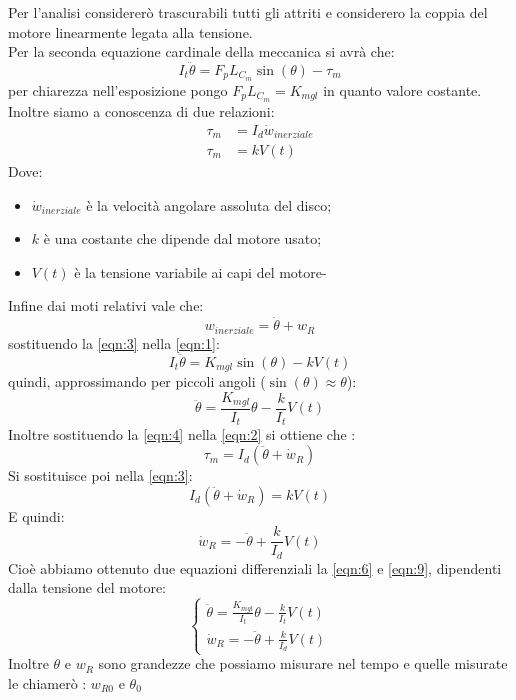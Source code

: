 \documentclass[12pt,a4paper,twoside, openright]{scrartcl}
\newcommand{\thetap}{\dot{\theta}}
\newcommand{\thetapp}{\ddot{\theta}}
\begin{document}
	Per l'analisi considererò trascurabili tutti gli attriti e considerero la coppia del motore linearmente legata alla tensione.\\
	Per la seconda equazione cardinale della meccanica si avrà che:
	\begin{equation}
		\label{eqn:1}
		I_t\thetapp=F_p L_{C_m}\sin(\theta)- \tau_m
	\end{equation}
	per chiarezza nell'esposizione pongo $F_p L_{C_m}=K_{mgl}$ in quanto valore costante.
	Inoltre siamo a conoscenza di due relazioni:
	\begin{align}
	 	\tau_m &=I_d \dot{w}_{inerziale} \label{eqn:2} \\
	 	\tau_m &=kV(t) \label{eqn:3}
	 \end{align}
	Dove:
	\begin{itemize}
		\item $\dot{w}_{inerziale}$ è la velocità angolare assoluta del disco;
		\item $k$ è una costante che dipende dal motore usato;
		\item $V(t)$ è la tensione variabile ai capi del motore-
	\end{itemize}
	Infine dai moti relativi vale che:
	\begin{equation}
		\label{eqn:4}
		w_{inerziale}=\thetap+w_R 
	\end{equation}
	sostituendo la \ref{eqn:3} nella \ref{eqn:1}:
	\begin{equation}
		\label{eqn:5}
	 	I_t\thetapp=K_{mgl}\sin(\theta)-kV(t)
	\end{equation}
	quindi, approssimando per piccoli angoli ($\sin(\theta)\approx \theta$):
	\begin{equation}
		\label{eqn:6}
	 	\thetapp=\frac{K_{mgl}}{I_t}\theta-\frac{k}{I_t}V(t)
	\end{equation}
 	Inoltre sostituendo la \ref{eqn:4} nella \ref{eqn:2} si ottiene che :
	\begin{equation}
		\label{eqn:7}
		\tau_m =I_d(\thetapp+\dot w_R) 
	\end{equation}
	Si sostituisce poi nella \ref{eqn:3}:
	\begin{equation}
		\label{eqn:8}
		I_d(\thetapp+\dot w_R)=kV(t) 
	\end{equation}
	E quindi:
	\begin{equation}
		\label{eqn:9}
		\dot w_R=-\thetapp+\frac{k}{I_d}V(t) 
	\end{equation}
	Cioè abbiamo ottenuto due equazioni differenziali la \ref{eqn:6} e \ref{eqn:9}, dipendenti dalla tensione del motore:
	\begin{equation}
		\label{sis:1}
			\begin{cases}
				\thetapp=\frac{K_{mgl}}{I_t}\theta-\frac{k}{I_t}V(t)\\
				\dot w_R=-\thetapp+\frac{k}{I_d}V(t) 
			\end{cases}
	\end{equation}
	Inoltre $\theta$ e $w_R$ sono grandezze che possiamo misurare nel tempo e quelle misurate le chiamerò : $w_{R0}$ e $\theta_0$
\end{document}
